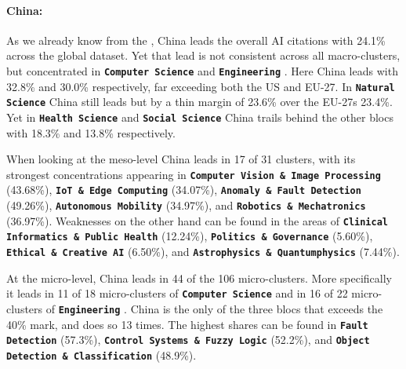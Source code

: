 \documentclass{article}
\begin{document}
	\paragraph{China:} As we already know from the , China leads the overall  AI citations with 24.1\% across the global dataset. Yet that lead is not consistent across all macro-clusters, but concentrated in \textbf{\texttt{Computer Science}}  and \textbf{\texttt{Engineering}} . Here China leads with 32.8\% and 30.0\% respectively, far exceeding both the US and EU-27. In \textbf{\texttt{Natural Science}}  China still leads but by a thin margin of 23.6\% over the EU-27s 23.4\%. Yet in \textbf{\texttt{Health Science}}  and \textbf{\texttt{Social Science}}  China trails behind the other blocs with 18.3\% and 13.8\% respectively. 
	
	When looking at the meso-level China leads in 17 of 31 clusters, with its strongest concentrations appearing in \textbf{\texttt{Computer Vision \& Image Processing}}  (43.68\%), \textbf{\texttt{IoT \& Edge Computing}}  (34.07\%), \textbf{\texttt{Anomaly \& Fault Detection}}  (49.26\%), \textbf{\texttt{Autonomous Mobility}}  (34.97\%), and \textbf{\texttt{Robotics \& Mechatronics}}  (36.97\%). Weaknesses on the other hand can be found in the areas of \textbf{\texttt{Clinical Informatics \& Public Health}}  (12.24\%), \textbf{\texttt{Politics \& Governance}}  (5.60\%), \textbf{\texttt{Ethical \& Creative AI}}  (6.50\%), and \textbf{\texttt{Astrophysics \& Quantumphysics}}  (7.44\%). 
	
	At the micro-level, China leads in 44 of the 106 micro-clusters. More specifically it leads in 11 of 18 micro-clusters of \textbf{\texttt{Computer Science}}  and in 16 of 22 micro-clusters of \textbf{\texttt{Engineering}} . China is the only of the three blocs that exceeds the 40\% mark, and does so 13 times. The highest shares can be found in \textbf{\texttt{Fault Detection}}  (57.3\%), \textbf{\texttt{Control Systems \& Fuzzy Logic}}  (52.2\%), and \textbf{\texttt{Object Detection \& Classification}}  (48.9\%).
	
\end{document}
